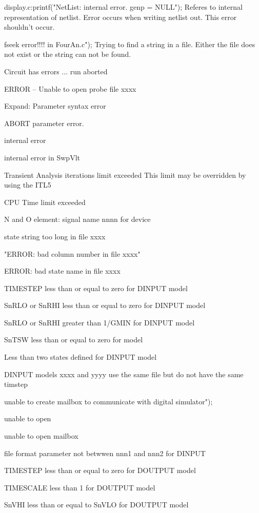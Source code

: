 display.c:printf("NetList: internal error.  genp = NULL\n");
Referes to internal representation of netlist. Error occurs when writing
netlist out.  This error shouldn't occur.

fseek error!!!! in FourAn.c\n");
Trying to find a string in a file. Either the file does not exist or
the string can not be found.

Circuit has errors ... run aborted

ERROR -- Unable to open probe file xxxx

Expand: Parameter syntax error

ABORT parameter error.

internal error

internal error in SwpVlt

Transient Analysis iterations limit exceeded
This limit may be overridden by using the ITL5




CPU Time limit exceeded




N and O element:
signal name nnnn for device %

state string too long in file xxxx

"ERROR: bad column number in file xxxx"

ERROR: bad state name in file xxxx

TIMESTEP less than or equal to zero for DINPUT model

SnRLO or SnRHI less than or equal to zero for DINPUT model

SnRLO or SnRHI greater than 1/GMIN for DINPUT model

SnTSW less than or equal to zero for model

Less than two states defined for DINPUT model

DINPUT models xxxx and yyyy use the same file but do not have the same timstep

unable to create mailbox to communicate with digital simulator");

unable to open %

unable to open mailbox %

file format parameter not betwwen nnn1 and nnn2 for DINPUT

TIMESTEP less than or equal to zero for DOUTPUT model

TIMESCALE less than 1 for DOUTPUT model

SnVHI less than or equal to SnVLO for DOUTPUT model

